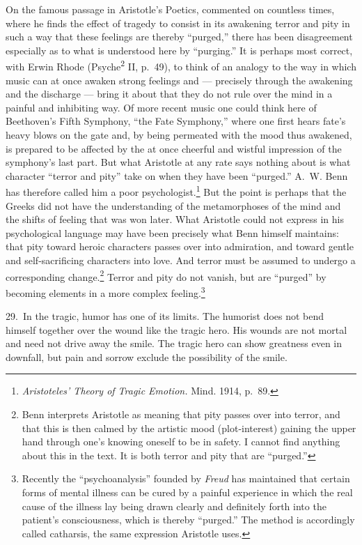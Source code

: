 \documentclass[12pt]{book}
\newcommand{\opage}[1]{\marginnote{\footnotesize\textit{[#1]}}}
\begin{document}
On the famous passage in Aristotle's Poetics, commented on countless times, where he finds
the effect of tragedy to consist in its awakening terror and pity in such a way that these
feelings are thereby ``purged,'' there has been disagreement especially as to what is
understood here by ``purging.'' It is perhaps most correct, with Erwin Rhode
(Psyche\textsuperscript{2} II, p.~49), to think of an analogy to the way in which music
can at once awaken strong feelings and --- precisely through the awakening and the
discharge --- bring it about that they do not rule over the mind in a painful and
inhibiting way.
Of more recent music one could think here of Beethoven's Fifth Symphony, ``the Fate
Symphony,'' where one first hears fate's heavy blows on the gate and, by being permeated
with the mood thus awakened, is prepared to be affected by the at once cheerful and wistful
impression of the symphony's last part. But what Aristotle at any rate says nothing about
is what \opage{102}character ``terror and pity'' take on when they have been ``purged.''
A.~W. Benn has therefore called him a poor psychologist.\footnote{\textit{Aristoteles'
Theory of Tragic Emotion.} Mind. 1914, p.~89.} But the point is perhaps that the Greeks
did not have the understanding of the metamorphoses of the mind and the shifts of feeling
that was won later. What Aristotle could not express in his psychological language may
have been precisely what Benn himself maintains: that pity toward heroic characters passes
over into admiration, and toward gentle and self-sacrificing characters into love. And
terror must be assumed to undergo a corresponding change.\footnote{Benn interprets
Aristotle as meaning that pity passes over into terror, and that this is then calmed by
the artistic mood (plot-interest) gaining the upper hand through one's knowing oneself to
be in safety. I cannot find anything about this in the text. It is both terror and pity
that are ``purged.''} Terror and pity do not vanish, but are ``purged'' by becoming
elements in a more complex feeling.\footnote{Recently the ``psychoanalysis'' founded by
\textit{Freud} has maintained that certain forms of mental illness can be cured by a
painful experience in which the real cause of the illness lay being drawn clearly and
definitely forth into the patient's consciousness, which is thereby ``purged.'' The
method is accordingly called catharsis, the same expression Aristotle uses.}

29.~In the tragic, humor has one of its limits. The humorist does not bend himself
together over the wound like the tragic hero. His wounds are not mortal and need not drive
away the smile. The tragic hero can show greatness even in downfall, but pain and sorrow
exclude the possibility of the smile.
\end{document}
